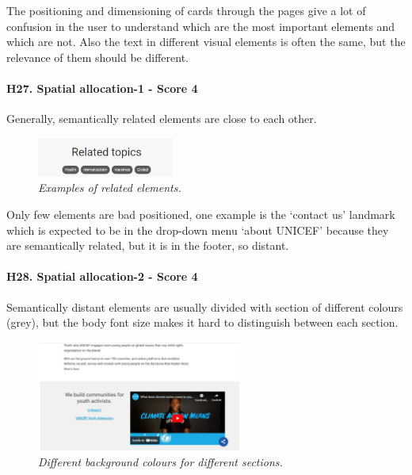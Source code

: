 \newline The positioning and dimensioning of cards through the pages give a lot of confusion in the user to understand which are the most important elements and which are not.
\newline Also the text in different visual elements is often the same, but the relevance of them should be different.
\newline
\newline \paragraph{H27. Spatial allocation-1 - Score 4} \label{subsec:H27}	Generally, semantically related elements are close to each other.
\begin{figure}[!h]
	\begin{center}
		\includegraphics[width=0.4\textwidth]{FinalScores30.jpg}
		\captionsetup{font=small}
		\caption{\textit{Examples of related elements.}}
	\end{center}
\end{figure}
\newline Only few elements are bad positioned, one example is the ‘contact us’ landmark which is expected to be in the drop-down menu ‘about UNICEF’ because they are semantically related, but it is in the footer, so distant.
\newline
\newline \paragraph{H28. Spatial allocation-2 - Score 4} \label{subsec:H28}	Semantically distant elements are usually divided with section of different colours (grey), but the body font size makes it hard to distinguish between each section. 
\begin{figure}[!h]
	\begin{center}
		\includegraphics[width=0.6\textwidth]{FinalScores31.jpg}
		\captionsetup{font=small}
		\caption{\textit{Different background colours for different sections.}}
	\end{center}
\end{figure}
